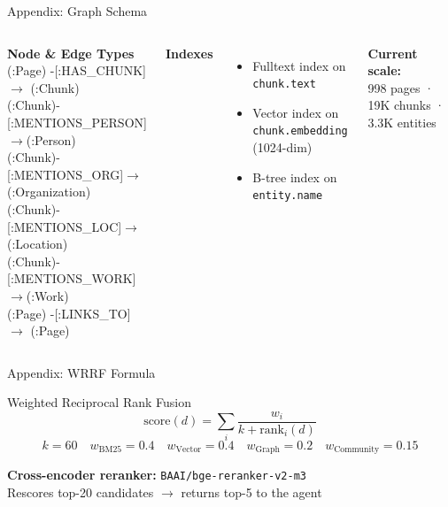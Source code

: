 \documentclass[aspectratio=169]{beamer}
\begin{document}
\begin{frame}{Appendix: Graph Schema}
\begin{columns}[T]
\textbf{Node \& Edge Types}\\[6pt]
{\small\ttfamily
(:Page) -[:HAS\_CHUNK]$\rightarrow$ (:Chunk)\\[2pt]
(:Chunk)-[:MENTIONS\_PERSON]$\rightarrow$(:Person)\\
(:Chunk)-[:MENTIONS\_ORG]$\rightarrow$(:Organization)\\
(:Chunk)-[:MENTIONS\_LOC]$\rightarrow$(:Location)\\
(:Chunk)-[:MENTIONS\_WORK]$\rightarrow$(:Work)\\[2pt]
(:Page) -[:LINKS\_TO]$\rightarrow$ (:Page)
}

\textbf{Indexes}
\begin{itemize}
  \item Fulltext index on \texttt{chunk.text}
  \item Vector index on \texttt{chunk.embedding} (1024-dim)
  \item B-tree index on \texttt{entity.name}
\end{itemize}
\vspace{0.4em}
\textbf{Current scale:}\\
998 pages · 19K chunks · 3.3K entities
\end{columns}
\end{frame}

\begin{frame}{Appendix: WRRF Formula}
\begin{block}{Weighted Reciprocal Rank Fusion}
\[
\text{score}(d) = \sum_i \frac{w_i}{k + \text{rank}_i(d)}
\]
\[
k = 60 \quad w_{\text{BM25}} = 0.4 \quad w_{\text{Vector}} = 0.4 \quad w_{\text{Graph}} = 0.2 \quad w_{\text{Community}} = 0.15
\]
\end{block}
\vspace{0.5em}
\textbf{Cross-encoder reranker:} \texttt{BAAI/bge-reranker-v2-m3}\\
Rescores top-20 candidates $\rightarrow$ returns top-5 to the agent
\end{frame}
\end{document}
